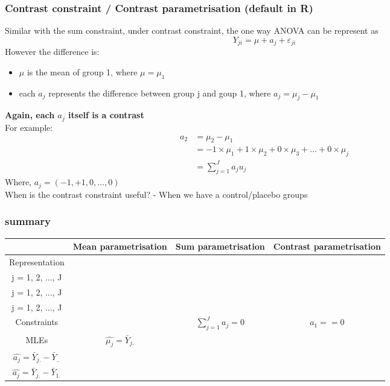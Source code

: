 \documentclass[12pt ]{article}
\begin{document}
\subsubsection{Contrast constraint / Contrast parametrisation (default in R)}
Similar with the sum constraint, under contrast constraint, the one way ANOVA can be represent as
\begin{equation*}
Y_{ji} = \mu + a_{j} + \varepsilon_{ji}
\end{equation*}
However the difference is:
\begin{itemize}
\item $\mu$ is the mean of group 1, where $\mu = \mu_{1}$
\item each $a_{j}$ represents the difference between group j and goup 1, where $a_{j} = \mu_{j} - \mu_{1}$
\end{itemize} 
\textbf{Again, each $a_{j}$ itself is a contrast} \\
For example:
\begin{align*}
a_{2} &= \mu_{2} - \mu_{1} \\
&= -1 \times \mu_{1} + 1 \times \mu_{2} + 0 \times \mu_{3} + \ldots + 0 \times \mu_{j} \\
& = \sum^{J}_{j=1} a_{j} u_{j}
\end{align*}
Where, $a_{j} = (-1, +1, 0, \ldots, 0)$ \\
When is the contrast constraint useful? - When we have a control/placebo groups
\subsubsection{summary}
\begin{center}
\begin{tabular}{||c| c  c  c||}
\hline
 & Mean parametrisation & Sum parametrisation & Contrast parametrisation\\ [0.5ex]
\hline \hline
Representation & \makecell{$Y_{ji} = \mu_{j} + \varepsilon_{ji}$ \\ j = 1, 2, ..., J} & \makecell{$Y_{ji} = \mu + a_{j} + \varepsilon_{ji}$ \\ j = 1, 2, ..., J} & \makecell{$Y_{ji} = \mu + a_{j} + \varepsilon_{ji}
$ \\ j = 1, 2, ..., J} \\
\hline
Constraints & & $\sum_{j=1}^{J} a_{j} = 0$ & $a_{1} == 0$ \\
\hline
MLEs & $\hat{\mu_{j}} = \bar{Y}_{j.}$ & \makecell{$\hat{\mu_{j}} = \bar{Y}_{..}$ \\ $\hat{a_{j}} = \bar{Y}_{j.} - \bar{Y}_{..}$} & \makecell{$\hat{\mu_{j}} = \bar{Y}_{1.}$ \\ $\hat{a_{j}} = \bar{Y}_{j.} - \bar{Y}_{1.}$} \\
\hline
\hline
\end{tabular}
\end{center}
\end{document}
